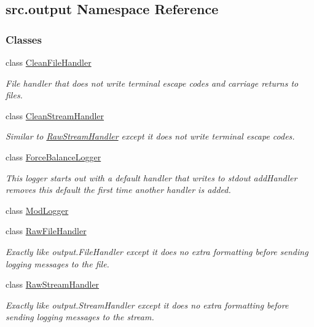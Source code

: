 \hypertarget{namespacesrc_1_1output}{}\subsection{src.\+output Namespace Reference}
\label{namespacesrc_1_1output}
\subsubsection*{Classes}
\begin{DoxyCompactItemize}
\item 
class \hyperlink{classsrc_1_1output_1_1CleanFileHandler}{Clean\+File\+Handler}
\begin{DoxyCompactList}\small\item\em File handler that does not write terminal escape codes and carriage returns to files. \end{DoxyCompactList}\item 
class \hyperlink{classsrc_1_1output_1_1CleanStreamHandler}{Clean\+Stream\+Handler}
\begin{DoxyCompactList}\small\item\em Similar to \hyperlink{classsrc_1_1output_1_1RawStreamHandler}{Raw\+Stream\+Handler} except it does not write terminal escape codes. \end{DoxyCompactList}\item 
class \hyperlink{classsrc_1_1output_1_1ForceBalanceLogger}{Force\+Balance\+Logger}
\begin{DoxyCompactList}\small\item\em This logger starts out with a default handler that writes to stdout add\+Handler removes this default the first time another handler is added. \end{DoxyCompactList}\item 
class \hyperlink{classsrc_1_1output_1_1ModLogger}{Mod\+Logger}
\item 
class \hyperlink{classsrc_1_1output_1_1RawFileHandler}{Raw\+File\+Handler}
\begin{DoxyCompactList}\small\item\em Exactly like output.\+File\+Handler except it does no extra formatting before sending logging messages to the file. \end{DoxyCompactList}\item 
class \hyperlink{classsrc_1_1output_1_1RawStreamHandler}{Raw\+Stream\+Handler}
\begin{DoxyCompactList}\small\item\em Exactly like output.\+Stream\+Handler except it does no extra formatting before sending logging messages to the stream. \end{DoxyCompactList}\end{DoxyCompactItemize}
